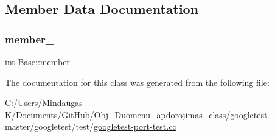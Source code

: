 \subsection{Member Data Documentation}
\mbox{\label{classtesting_1_1internal_1_1_base_ac085e9bc63731afa61028d3b5b401cd9}} 
\subsubsection{\texorpdfstring{member\_}{member\_}}
{\footnotesize\ttfamily int Base\+::member\+\_\+\hspace{0.3cm}{\ttfamily [private]}}



The documentation for this class was generated from the following file\+:\begin{DoxyCompactItemize}
\item 
C\+:/\+Users/\+Mindaugas K/\+Documents/\+Git\+Hub/\+Obj\+\_\+\+Duomenu\+\_\+apdorojimas\+\_\+class/googletest-\/master/googletest/test/\mbox{\hyperlink{googletest-master_2googletest_2test_2googletest-port-test_8cc}{googletest-\/port-\/test.\+cc}}\end{DoxyCompactItemize}
